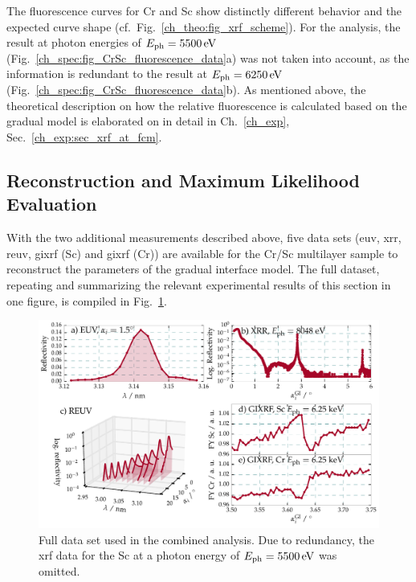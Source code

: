 The fluorescence curves for Cr and Sc show distinctly different behavior and the expected curve shape (cf.~Fig.~\ref{ch_theo:fig_xrf_scheme}). For the analysis, the result at photon energies of $E_\text{ph}=\ev{5500}$ (Fig.~\ref{ch_spec:fig_CrSc_fluorescence_data}a)  was not taken into account, as the information is redundant to the result at  $E_\text{ph}=\ev{6250}$ (Fig.~\ref{ch_spec:fig_CrSc_fluorescence_data}b). As mentioned above, the theoretical description on how the relative fluorescence is calculated based on the gradual model is elaborated on in detail in Ch.~\ref{ch_exp}, Sec.~\ref{ch_exp:sec_xrf_at_fcm}.

\subsection{Reconstruction and Maximum Likelihood Evaluation}\label{ch_spec:sec_CrSc_results}
With the two additional measurements described above, five data sets (\gls{euv}, \gls{xrr}, \gls{reuv}, \gls{gixrf} (Sc) and \gls{gixrf} (Cr)) are available for the Cr/Sc multilayer sample to reconstruct the parameters of the gradual interface model. The full dataset, repeating and summarizing the relevant experimental results of this section in one figure, is compiled in Fig.~\ref{ch_spec:fig_CrSc_all_data}.
\begin{figure}[htbp]
  \centering
  \includegraphics[width=\textwidth]{img/CrSc_all_data}
  \caption[Full data set from the Cr/Sc sample used in the combined analysis.]{Full data set used in the combined analysis. Due to redundancy, the \gls{xrf} data for the Sc at a photon energy of $E_\text{ph}=\ev{5500}$ was omitted.}
  \label{ch_spec:fig_CrSc_all_data}
\end{figure}

